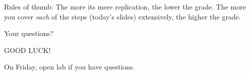 \documentclass[compress]{beamer}
\begin{document}
\begin{frame}[standout]
Rules of thumb: The more its mere replication, the lower the grade. The more you cover \emph{each} of the steps (today's slides) extensively, the higher the grade.

\end{frame}





\begin{frame}[standout]
Your questions?
\end{frame}





\begin{frame}[standout]
GOOD LUCK!
\end{frame}


\begin{frame}[standout]

On Friday, open lab if you have questions.

\end{frame}



\begin{frame}
\printbibliography
\end{frame}
\end{document}
